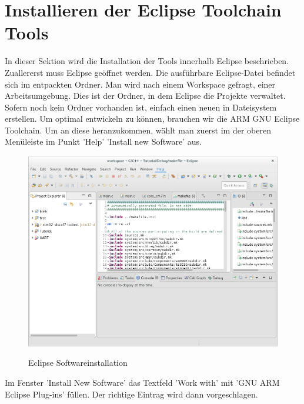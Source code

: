 \section{Installieren der Eclipse Toolchain Tools}
In dieser Sektion wird die Installation der Tools innerhalb Eclipse beschrieben.
Zuallererst muss Eclipse geöffnet werden. Die ausführbare Eclipse-Datei befindet sich im entpackten Ordner.
Man wird nach einem Workspace gefragt, einer Arbeitsumgebung. Dies ist der Ordner, in dem Eclipse die Projekte verwaltet. Sofern noch kein Ordner vorhanden ist, einfach einen neuen in Dateisystem erstellen.
Um optimal entwickeln zu können, brauchen wir die ARM GNU Eclipse Toolchain. Um an diese heranzukommen, wählt man zuerst im der oberen Menüleiste im Punkt 'Help' 'Install new Software' aus.
\begin{figure}[h]
\begin{center}
\includegraphics[width=12cm]{grafiken/debugger/EclipseNewSoftware.png}
\label{eclipse_softwareinstallation}
\caption{Eclipse Softwareinstallation}
\end{center}
\end{figure}
Im Fenster 'Install New Software' das Textfeld 'Work with' mit 'GNU ARM Eclipse Plug-ins' füllen. Der richtige Eintrag wird dann vorgeschlagen.

